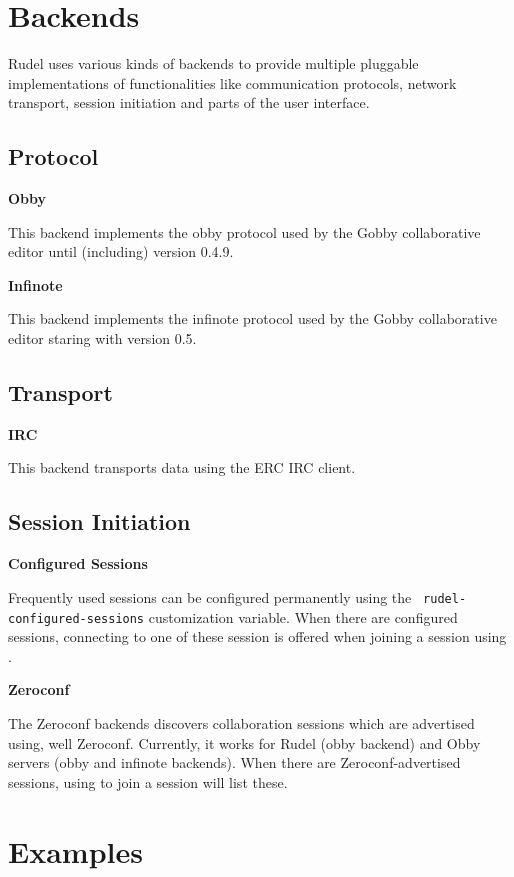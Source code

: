 \newcolumn

\section{Backends}

\lesssectionskip
Rudel uses various kinds of backends to provide multiple pluggable
implementations of functionalities like communication protocols,
network transport, session initiation and parts of the user interface.

\subsection{Protocol}

{\bf Obby}

This backend implements the obby protocol used by the Gobby
collaborative editor until (including) version 0.4.9.

{\bf Infinote}

This backend implements the infinote protocol used by the Gobby
collaborative editor staring with version 0.5.

\subsection{Transport}

{\bf IRC}

This backend transports data using the ERC IRC client.

\subsection{Session Initiation}

{\bf Configured Sessions}

Frequently used sessions can be configured permanently using the {\tt
rudel-configured-sessions} customization variable. When there are
configured sessions, connecting to one of these session is offered
when joining a session using .

{\bf Zeroconf}

The Zeroconf backends discovers collaboration sessions which are
advertised using, well Zeroconf. Currently, it works for Rudel (obby
backend) and Obby servers (obby and infinote backends). When there are
Zeroconf-advertised sessions, using  to join a session
will list these.

\newcolumn

\section{Examples}

